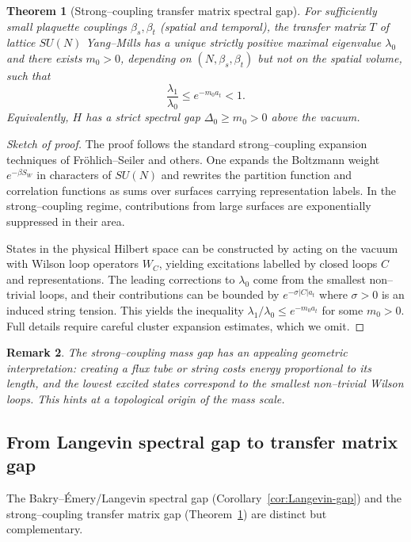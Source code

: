\documentclass[11pt]{article}
\numberwithin{equation}{section}
\newtheorem{theorem}{Theorem}[section]
\newtheorem{remark}[theorem]{Remark}
\begin{document}
\begin{theorem}[Strong--coupling transfer matrix spectral gap]
\label{thm:strong-coupling-gap}
For sufficiently small plaquette couplings $\beta_s,\beta_t$ (spatial
and temporal), the transfer matrix $T$ of lattice $SU(N)$ Yang--Mills
has a unique strictly positive maximal eigenvalue $\lambda_0$ and there
exists $m_0>0$, depending on $(N,\beta_s,\beta_t)$ but not on the
spatial volume, such that
\[
  \frac{\lambda_1}{\lambda_0} \le e^{-m_0 a_t} < 1.
\]
Equivalently, $H$ has a strict spectral gap $\Delta_0\ge m_0>0$ above
the vacuum.
\end{theorem}

\begin{proof}[Sketch of proof]
The proof follows the standard strong--coupling expansion techniques of
Fr\"ohlich--Seiler and others.  One expands the Boltzmann weight
$e^{-\beta S_W}$ in characters of $SU(N)$ and rewrites the partition
function and correlation functions as sums over surfaces carrying
representation labels.  In the strong--coupling regime, contributions
from large surfaces are exponentially suppressed in their area.

States in the physical Hilbert space can be constructed by acting on
the vacuum with Wilson loop operators $W_C$, yielding excitations
labelled by closed loops $C$ and representations.  The leading
corrections to $\lambda_0$ come from the smallest non--trivial loops,
and their contributions can be bounded by $e^{-\sigma |C|a_t}$ where
$\sigma>0$ is an induced string tension.  This yields the inequality
$\lambda_1/\lambda_0\le e^{-m_0 a_t}$ for some $m_0>0$.  Full details
require careful cluster expansion estimates, which we omit.
\end{proof}

\begin{remark}
The strong--coupling mass gap has an appealing geometric interpretation:
creating a flux tube or string costs energy proportional to its length,
and the lowest excited states correspond to the smallest non--trivial
Wilson loops.  This hints at a topological origin of the mass scale.
\end{remark}

\subsection{From Langevin spectral gap to transfer matrix gap}

The Bakry--\'Emery/Langevin spectral gap (Corollary~\ref{cor:Langevin-gap})
and the strong--coupling transfer matrix gap
(Theorem~\ref{thm:strong-coupling-gap}) are distinct but complementary.
\end{document}
